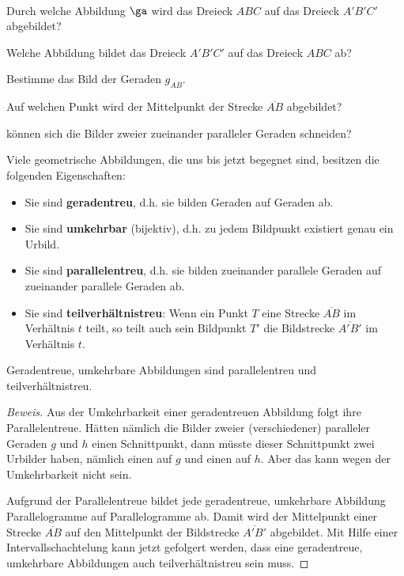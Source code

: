 \documentclass[%
11pt,%
twoside,%
titlepage,%
german,%
headsepline%
]{scrartcl}
\begin{document}
\begin{ueb}
\ \\[-4ex]
\begin{enumeratea}
\item Durch welche Abbildung $\ga$ wird das Dreieck $ABC$ auf das Dreieck $A'B'C'$ abgebildet?
\item Welche Abbildung bildet das Dreieck $A'B'C'$ auf das Dreieck $ABC$ ab?
\item Bestimme das Bild der Geraden $g_{AB}$.
\item Auf welchen Punkt wird der Mittelpunkt der Strecke $\overline{AB}$ abgebildet?
\item können sich die Bilder zweier zueinander paralleler Geraden schneiden?
\end{enumeratea}
\end{ueb}

Viele geometrische Abbildungen, die uns bis jetzt begegnet sind, besitzen die folgenden Eigenschaften:
\begin{itemize}
\item Sie sind \textbf{geradentreu}, d.h. sie bilden Geraden auf Geraden ab.
\item Sie sind \textbf{umkehrbar} (bijektiv), d.h. zu jedem Bildpunkt existiert genau ein Urbild.
\item Sie sind \textbf{parallelentreu}, d.h. sie bilden zueinander parallele Geraden auf zueinander parallele Geraden ab.
\item Sie sind \textbf{teilverhältnistreu}: Wenn ein Punkt $T$ eine Strecke $\overline{AB}$ im Verhältnis $t$ teilt, so teilt auch sein Bildpunkt $T'$ die Bildstrecke $\overline{A'B'}$ im Verhältnis $t$.
\end{itemize}

\begin{satz}
Geradentreue, umkehrbare Abbildungen sind parallelentreu und teilverhältnistreu.
\end{satz}

\begin{proof}[Beweis]
Aus der Umkehrbarkeit einer geradentreuen Abbildung folgt ihre Parallelentreue. Hätten nämlich die Bilder zweier (verschiedener) paralleler Geraden $g$ und $h$ einen Schnittpunkt, dann müsste dieser Schnittpunkt zwei Urbilder haben, nämlich einen auf $g$ und einen auf $h$. Aber das kann wegen der Umkehrbarkeit nicht sein.

Aufgrund der Parallelentreue bildet jede geradentreue, umkehrbare Abbildung Parallelogramme auf Parallelogramme ab. Damit wird der Mittelpunkt einer Strecke $\overline{AB}$ auf den Mittelpunkt der Bildstrecke $\overline{A'B'}$ abgebildet. Mit Hilfe einer Intervallschachtelung kann jetzt gefolgert werden, dass eine geradentreue, umkehrbare Abbildungen auch teilverhältnistreu sein muss.
\end{proof}
\end{document}
